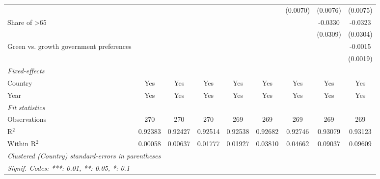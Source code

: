 \begin{table}[htbp]
\begin{tabular}{lcccccccc}
                                              &          &          &          &          &              & (0.0070)     & (0.0076)     & (0.0075)\\   
      Share of >65                            &          &          &          &          &              &              & -0.0330      & -0.0323\\   
                                              &          &          &          &          &              &              & (0.0309)     & (0.0304)\\   
      Green vs. growth government preferences &          &          &          &          &              &              &              & -0.0015\\   
                                              &          &          &          &          &              &              &              & (0.0019)\\   
      \midrule
      \emph{Fixed-effects}\\
      Country                                 & Yes      & Yes      & Yes      & Yes      & Yes          & Yes          & Yes          & Yes\\  
      Year                                    & Yes      & Yes      & Yes      & Yes      & Yes          & Yes          & Yes          & Yes\\  
      \midrule
      \emph{Fit statistics}\\
      Observations                            & 270      & 270      & 270      & 269      & 269          & 269          & 269          & 269\\  
      R$^2$                                   & 0.92383  & 0.92427  & 0.92514  & 0.92538  & 0.92682      & 0.92746      & 0.93079      & 0.93123\\  
      Within R$^2$                            & 0.00058  & 0.00637  & 0.01777  & 0.01927  & 0.03810      & 0.04662      & 0.09037      & 0.09609\\  
      \midrule \midrule
      \multicolumn{9}{l}{\emph{Clustered (Country) standard-errors in parentheses}}\\
      \multicolumn{9}{l}{\emph{Signif. Codes: ***: 0.01, **: 0.05, *: 0.1}}\\
   \end{tabular}
\end{table}


